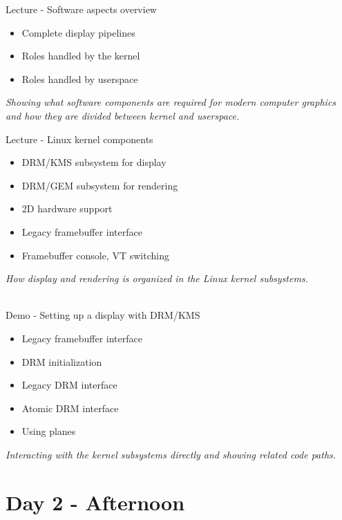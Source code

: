 \documentclass[a4paper,12pt,obeyspaces,spaces,hyphens]{article}
\begin{document}
\feagendatwocolumn
{Lecture - Software aspects overview}
{
  \begin{itemize}
  \item Complete display pipelines
  \item Roles handled by the kernel
  \item Roles handled by userspace
  \end{itemize}
  \vspace{0.5em}
  {\em Showing what software components are required for modern computer graphics and how they are divided between kernel and userspace.}
}
{Lecture - Linux kernel components}
{
  \begin{itemize}
  \item DRM/KMS subsystem for display
  \item DRM/GEM subsystem for rendering
  \item 2D hardware support
  \item Legacy framebuffer interface
  \item Framebuffer console, VT switching
  \end{itemize}
  \vspace{0.5em}
  {\em How display and rendering is organized in the Linux kernel subsystems.}
}
\\
\feagendaonecolumn
{Demo - Setting up a display with DRM/KMS}
{
  \begin{itemize}
  \item Legacy framebuffer interface
  \item DRM initialization
  \item Legacy DRM interface
  \item Atomic DRM interface
  \item Using planes
  \end{itemize}
  \vspace{0.5em}
  {\em Interacting with the kernel subsystems directly and showing related code paths.}
}


\section{Day 2 - Afternoon}
\end{document}
